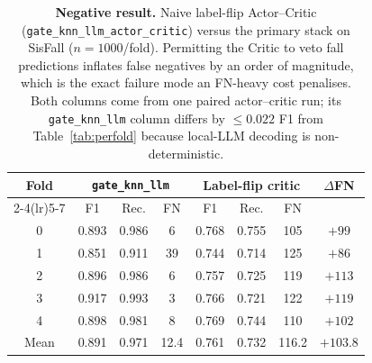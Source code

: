 \begin{table}[!t]
\centering
\caption{\textbf{Negative result.} Naive label-flip Actor--Critic (\texttt{gate\_knn\_llm\_actor\_critic}) versus the primary stack on SisFall ($n{=}1000$/fold). Permitting the Critic to veto fall predictions inflates false negatives by an order of magnitude, which is the exact failure mode an FN-heavy cost penalises. Both columns come from one paired actor--critic run; its \texttt{gate\_knn\_llm} column differs by ${\le}0.022$ F1 from Table~\ref{tab:perfold} because local-LLM decoding is non-deterministic.}
\label{tab:negative}
\setlength{\tabcolsep}{4pt}
\begin{tabular}{c ccc ccc c}
\toprule
Fold & \multicolumn{3}{c}{\texttt{gate\_knn\_llm}} & \multicolumn{3}{c}{Label-flip critic} & $\Delta$FN \\
\cmidrule(lr){2-4}\cmidrule(lr){5-7}
 & F1 & Rec. & FN & F1 & Rec. & FN & \\
\midrule
0 & 0.893 & 0.986 & 6  & 0.768 & 0.755 & 105 & $+99$  \\
1 & 0.851 & 0.911 & 39 & 0.744 & 0.714 & 125 & $+86$  \\
2 & 0.896 & 0.986 & 6  & 0.757 & 0.725 & 119 & $+113$ \\
3 & 0.917 & 0.993 & 3  & 0.766 & 0.721 & 122 & $+119$ \\
4 & 0.898 & 0.981 & 8  & 0.769 & 0.744 & 110 & $+102$ \\
\midrule
Mean & 0.891 & 0.971 & 12.4 & 0.761 & 0.732 & 116.2 & $+103.8$ \\
\bottomrule
\end{tabular}
\end{table}
